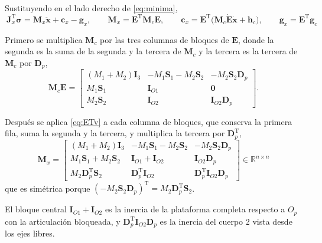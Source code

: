 \documentclass[11pt]{article}
\newcommand{\T}{^{\mathrm{T}}}
\newcommand{\sig}{\boldsymbol{\sigma}}
\newcommand{\xd}{\dot{\mathbf{x}}}
\newcommand{\xdd}{\ddot{\mathbf{x}}}
\newcommand{\IO}[1]{\mathbf{I}_{O#1}}
\begin{document}
Sustituyendo en el lado derecho de \eqref{eq:minima},
\begin{equation}
\boxed{\ \mathbf{J}_x\T\sig=\mathbf{M}_x\xdd+\mathbf{c}_x-\mathbf{g}_x,
\qquad
\mathbf{M}_x=\mathbf{E}\T\mathbf{M}_c\mathbf{E},
\qquad
\mathbf{c}_x=\mathbf{E}\T\big(\mathbf{M}_c\dot{\mathbf{E}}\xd+\mathbf{h}_c\big),
\qquad
\mathbf{g}_x=\mathbf{E}\T\mathbf{g}_c\ }
\label{eq:minx}
\end{equation}

Primero se multiplica $\mathbf{M}_c$ por las tres columnas de bloques de $\mathbf{E}$, donde la segunda es la suma de la segunda y la tercera de $\mathbf{M}_c$ y la tercera es la tercera de $\mathbf{M}_c$ por $\mathbf{D}_p$,
\begin{equation}
\mathbf{M}_c\mathbf{E}=
\begin{bmatrix}
(M_1+M_2)\mathbf{I}_3 & -M_1\mathbf{S}_1-M_2\mathbf{S}_2 & -M_2\mathbf{S}_2\mathbf{D}_p\\
M_1\mathbf{S}_1 & \IO{1} & \mathbf{0}\\
M_2\mathbf{S}_2 & \IO{2} & \IO{2}\mathbf{D}_p
\end{bmatrix}.
\label{eq:McE}
\end{equation}

Después se aplica \eqref{eq:ETv} a cada columna de bloques, que conserva la primera fila, suma la segunda y la tercera, y multiplica la tercera por $\mathbf{D}_p\T$,
\begin{equation}
\boxed{\ \mathbf{M}_x=
\begin{bmatrix}
(M_1+M_2)\mathbf{I}_3 & -M_1\mathbf{S}_1-M_2\mathbf{S}_2 & -M_2\mathbf{S}_2\mathbf{D}_p\\
M_1\mathbf{S}_1+M_2\mathbf{S}_2 & \IO{1}+\IO{2} & \IO{2}\mathbf{D}_p\\
M_2\mathbf{D}_p\T\mathbf{S}_2 & \mathbf{D}_p\T\IO{2} & \mathbf{D}_p\T\IO{2}\mathbf{D}_p
\end{bmatrix}\in\mathbb{R}^{n\times n}\ }
\label{eq:Mx}
\end{equation}
que es simétrica porque $(-M_2\mathbf{S}_2\mathbf{D}_p)\T=M_2\mathbf{D}_p\T\mathbf{S}_2$.

El bloque central $\IO{1}+\IO{2}$ es la inercia de la plataforma completa respecto a $O_p$ con la articulación bloqueada, y $\mathbf{D}_p\T\IO{2}\mathbf{D}_p$ es la inercia del cuerpo 2 vista desde los ejes libres.
\end{document}
